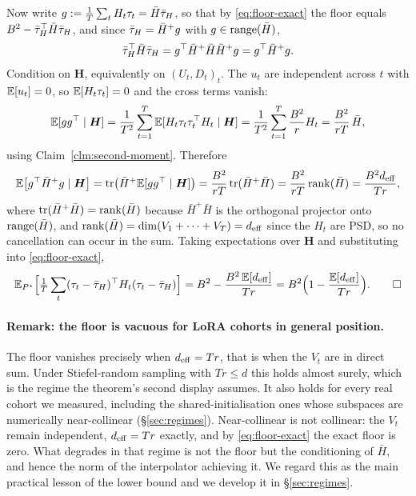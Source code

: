 Now write $g := \frac1T\sum_t H_t \tau_t = \bar H \bar{\tau}_H$, so that by
\eqref{eq:floor-exact} the floor equals $B^2 - \bar{\tau}_H^\top \bar H \bar{\tau}_H$, and
since $\bar{\tau}_H = \bar H^+ g$ with $g \in \operatorname{range}(\bar H)$,
\begin{equation*}
  \bar{\tau}_H^\top \bar H \bar{\tau}_H
  = g^\top \bar H^+ \bar H \bar H^+ g = g^\top \bar H^+ g .
\end{equation*}
Condition on $\boldsymbol H$, equivalently on $(U_t, D_t)_{t}$. The $u_t$ are
independent across $t$ with $\mathbb{E}[u_t] = 0$, so $\mathbb{E}[H_t\tau_t] = 0$ and the
cross terms vanish:
\begin{equation*}
  \mathbb{E}[g g^\top \mid \boldsymbol H]
  = \frac{1}{T^2}\sum_{t=1}^T \mathbb{E}[H_t\tau_t\tau_t^\top H_t \mid \boldsymbol H]
  = \frac{1}{T^2}\sum_{t=1}^T \frac{B^2}{r} H_t
  = \frac{B^2}{rT}\,\bar H ,
\end{equation*}
using Claim~\ref{clm:second-moment}. Therefore
\begin{equation*}
  \mathbb{E}\bigl[g^\top \bar H^+ g \mid \boldsymbol H\bigr]
  = \operatorname{tr}\bigl(\bar H^+ \mathbb{E}[g g^\top \mid \boldsymbol H]\bigr)
  = \frac{B^2}{rT}\operatorname{tr}(\bar H^+ \bar H)
  = \frac{B^2}{rT}\operatorname{rank}(\bar H)
  = \frac{B^2 d_{\mathrm{eff}}}{Tr},
\end{equation*}
where $\operatorname{tr}(\bar H^+\bar H) = \operatorname{rank}(\bar H)$ because $\bar H^+\bar H$ is the
orthogonal projector onto $\operatorname{range}(\bar H)$, and
$\operatorname{rank}(\bar H) = \dim(V_1 + \cdots + V_T) = d_{\mathrm{eff}}$ since the $H_t$ are PSD, so
no cancellation can occur in the sum. Taking expectations over
$\boldsymbol H$ and substituting into \eqref{eq:floor-exact},
\begin{equation*}
  \mathbb{E}_{P^\star}\Bigl[\tfrac1T\sum_t (\tau_t-\bar{\tau}_H)^\top H_t(\tau_t-\bar{\tau}_H)\Bigr]
  = B^2 - \frac{B^2\,\mathbb{E}[d_{\mathrm{eff}}]}{Tr}
  = B^2\Bigl(1 - \frac{\mathbb{E}[d_{\mathrm{eff}}]}{Tr}\Bigr).
  \tag*{$\square$}
\end{equation*}

\paragraph{Remark: the floor is vacuous for LoRA cohorts in general
position.} The floor vanishes precisely when $d_{\mathrm{eff}} = Tr$, that is when the
$V_t$ are in direct sum. Under Stiefel-random sampling with $Tr \leq d$ this
holds almost surely, which is the regime the theorem's second display
assumes. It also holds for every real cohort we measured, including the
shared-initialisation ones whose subspaces are numerically near-collinear
(\S\ref{sec:regimes}). Near-collinear is not collinear: the $V_t$ remain
independent, $d_{\mathrm{eff}} = Tr$ exactly, and by \eqref{eq:floor-exact} the exact
floor is zero. What degrades in that regime is not the floor but the
conditioning of $\bar H$, and hence the norm of the interpolator achieving it.
We regard this as the main practical lesson of the lower bound and we develop
it in \S\ref{sec:regimes}.

